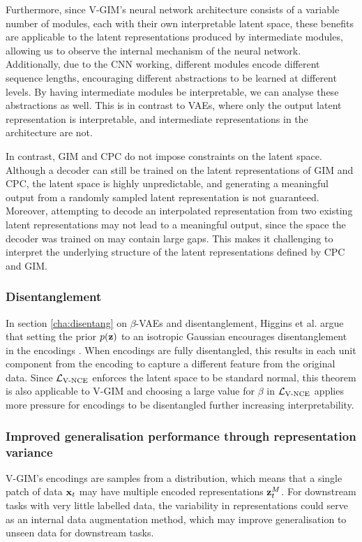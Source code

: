 		Furthermore, since V-GIM's neural network architecture consists of a variable number of modules, each with their own interpretable latent space, these benefits are applicable to the latent representations produced by intermediate modules, allowing us to observe the internal mechanism of the neural network. Additionally, due to the CNN working, different modules encode different sequence lengths, encouraging different abstractions to be learned at different levels. By having intermediate modules be interpretable, we can analyse these abstractions as well. This is in contrast to VAEs, where only the output latent representation is interpretable, and intermediate representations in the architecture are not.
		
		In contrast, GIM and CPC do not impose constraints on the latent space. Although a decoder can still be trained on the latent representations of GIM and CPC, the latent space is highly unpredictable, and generating a meaningful output from a randomly sampled latent representation is not guaranteed. Moreover, attempting to decode an interpolated representation from two existing latent representations may not lead to a meaningful output, since the space the decoder was trained on may contain large gaps. This makes it challenging to interpret the underlying structure of the latent representations defined by CPC and GIM. 

						
	\subsubsection{Disentanglement}
		In section \ref{cha:disentang} on $\beta$-VAEs and disentanglement, Higgins et al. argue that setting the prior $p(\mathbf{z})$ to an isotropic Gaussian encourages disentanglement in the encodings \cite{higginsBetaVAELearningBasic2022}. When encodings are fully disentangled, this results in each unit component from the encoding to capture a different feature from the original data. Since $\mathcal{L}_{\text{V-NCE}}$ enforces the latent space to be standard normal, this theorem is also applicable to V-GIM and choosing a large value for $\beta$ in $\mathcal{L}_{\text{V-NCE}}$ applies more pressure for encodings to be disentangled further increasing interpretability.
		
	
	\subsubsection{Improved generalisation performance through representation variance}
		V-GIM's encodings are samples from a distribution, which means that a single patch of data $\mathbf{x}_t$ may have multiple encoded representations $\mathbf{z}_t^M$. For downstream tasks with very little labelled data, the variability in representations could serve as an internal data augmentation method, which may improve generalisation to unseen data for downstream tasks.
		
